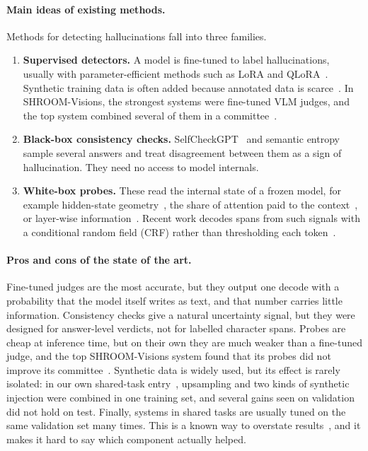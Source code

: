 \paragraph{Main ideas of existing methods.}
Methods for detecting hallucinations fall into three families.
\begin{enumerate}
    \item \textbf{Supervised detectors.} A model is fine-tuned to label hallucinations, usually with parameter-efficient methods such as LoRA and QLoRA~\cite{hu2022lora,dettmers2023qlora}. Synthetic training data is often added because annotated data is scarce~\cite{zhang2024perturbation,xie2024controlled,rykov-etal-2025-smurfcat}. In SHROOM-Visions, the strongest systems were fine-tuned VLM judges, and the top system combined several of them in a committee~\cite{vroomvroom2026}.
    \item \textbf{Black-box consistency checks.} SelfCheckGPT~\cite{manakul2023selfcheckgpt} and semantic entropy~\cite{farquhar2024semantic,kuhn2023semantic} sample several answers and treat disagreement between them as a sign of hallucination. They need no access to model internals.
    \item \textbf{White-box probes.} These read the internal state of a frozen model, for example hidden-state geometry~\cite{chen2024inside}, the share of attention paid to the context~\cite{chuang2024lookback}, or layer-wise information~\cite{kim2025layerwise}. Recent work decodes spans from such signals with a conditional random field (CRF) rather than thresholding each token~\cite{itkin2026temporal}.
\end{enumerate}

\paragraph{Pros and cons of the state of the art.}
Fine-tuned judges are the most accurate, but they output one decode with a probability that the model itself writes as text, and that number carries little information. Consistency checks give a natural uncertainty signal, but they were designed for answer-level verdicts, not for labelled character spans. Probes are cheap at inference time, but on their own they are much weaker than a fine-tuned judge, and the top SHROOM-Visions system found that its probes did not improve its committee~\cite{vroomvroom2026}. Synthetic data is widely used, but its effect is rarely isolated: in our own shared-task entry~\cite{rattanajaratkul2026smurfcat}, upsampling and two kinds of synthetic injection were combined in one training set, and several gains seen on validation did not hold on test. Finally, systems in shared tasks are usually tuned on the same validation set many times. This is a known way to overstate results~\cite{dwork2015reusable}, and it makes it hard to say which component actually helped.

